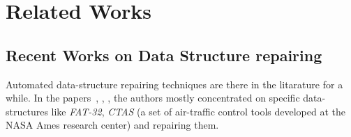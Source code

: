

\chapter{Related Works}
\label{chapter:relatedWorks}

\section{Recent Works on Data Structure repairing}
\label{sec:RecWorksDataStructure}

Automated data-structure repairing techniques are there in the litarature for
a while. In the papers~\cite{DBLP:conf/oopsla/DemskyR03},
\cite{Demsky03automaticdata}, \cite{DBLP:conf/icse/DemskyR05}, the authors
mostly concentrated on specific data-structures like \emph{FAT-32}, \emph{CTAS} (a
set of air-traffic control tools developed at the NASA Ames
research center) and repairing them. 
